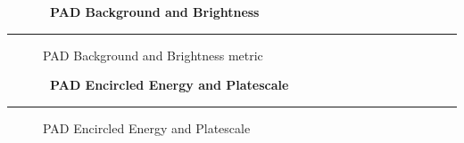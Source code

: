 \cleardoublepage
\begin{figure*}[h!]
  \centering
  \hfill
  {\Huge {\bf \quarter\ PAD Background and Brightness}}
  \hfill
\end{figure*}
\hrule
\begin{figure*}[h!]
  \centering
  \caption{PAD Background and Brightness metric}
\end{figure*}

\cleardoublepage
\begin{figure*}[h!]
  \centering
  \hfill
  {\Huge {\bf \quarter\ PAD Encircled Energy and Platescale}}
  \hfill
\end{figure*}
\hrule
\begin{figure*}[h!]
  \centering
  \caption{PAD Encircled Energy and Platescale}
\end{figure*}

